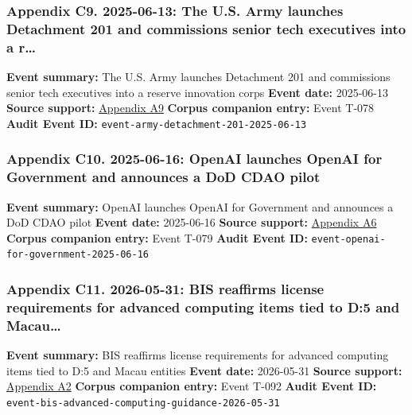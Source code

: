\documentclass[
  american,
  11pt,
  letterpaper,
]{article}
\begin{document}
\subsubsection{Appendix C9. 2025-06-13: The U.S. Army launches
Detachment 201 and commissions senior tech executives into a
r\ldots{}}\label{appendix-c9-2025-06-13-the-u-s-army-launches-detachment-201-and-commissions-senior-tech-executives-into-a-reserve-innovation-corps}

\textbf{Event summary:} The U.S. Army launches Detachment 201 and
commissions senior tech executives into a reserve innovation corps
\textbf{Event date:} 2025-06-13 \textbf{Source support:}
\hyperref[appendix-a9-army-launches-detachment-201-executive-innovation-corps-to-drive-tech-transformation]{Appendix
A9} \textbf{Corpus companion entry:} Event T-078 \textbf{Audit Event
ID:} \texttt{event-army-detachment-201-2025-06-13}

\subsubsection{Appendix C10. 2025-06-16: OpenAI launches OpenAI for
Government and announces a DoD CDAO
pilot}\label{appendix-c10-2025-06-16-openai-launches-openai-for-government-and-announces-a-dod-cdao-pilot}

\textbf{Event summary:} OpenAI launches OpenAI for Government and
announces a DoD CDAO pilot \textbf{Event date:} 2025-06-16
\textbf{Source support:}
\hyperref[appendix-a6-introducing-openai-for-government]{Appendix A6}
\textbf{Corpus companion entry:} Event T-079 \textbf{Audit Event ID:}
\texttt{event-openai-for-government-2025-06-16}

\subsubsection{Appendix C11. 2026-05-31: BIS reaffirms license
requirements for advanced computing items tied to D:5 and
Macau\ldots{}}\label{appendix-c11-2026-05-31-bis-reaffirms-license-requirements-for-advanced-computing-items-tied-to-d-5-and-macau-entities}

\textbf{Event summary:} BIS reaffirms license requirements for advanced
computing items tied to D:5 and Macau entities \textbf{Event date:}
2026-05-31 \textbf{Source support:}
\hyperref[appendix-a2-guidance-regarding-enforcement-of-license-requirements-for-advanced-computing-items-for-entities-headquartered-in-country-group-d-5-and-macau]{Appendix
A2} \textbf{Corpus companion entry:} Event T-092 \textbf{Audit Event
ID:} \texttt{event-bis-advanced-computing-guidance-2026-05-31}
\end{document}
